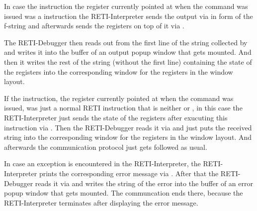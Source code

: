 \documentclass{report}
\begin{document}

In case the instruction the  register currently pointed at when the  command was issued was a  instruction the RETI-Interpreter sends the output via  in form of the f-string  and afterwards sends the registers on top of it via .

The RETI-Debugger then reads out  from the first line of the  string collected by  and writes it into the buffer of an output popup window that gets mounted. And then it writes the rest of the  string (without the first line) containing the state of the registers into the corresponding window for the registers in the window layout. %

If the instruction, the  register currently pointed at when the  command was issued, was just a normal RETI instruction that is neither  or , in this case the RETI-Interpreter just sends the state of the registers after exucuting this instruction via . Then the RETI-Debugger reads it via  and just puts the received  string into the corresponding window for the registers in the window layout. And afterwards the communication protocol just gets followed as usual.


In case an exception is encountered in the RETI-Interpreter, the RETI-Interpreter prints the corresponding error message via . After that the RETI-Debugger reads it via  and writes the  string of the error into the buffer of an error popup window that gets mounted. The communcation ends there, because the RETI-Interpreter terminates after displaying the error message.
\end{document}

